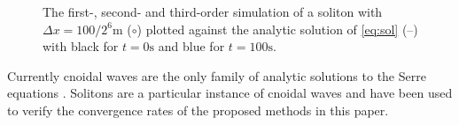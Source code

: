 \documentclass[SingleSpace,12pt]{Serre_ASCE}
\begin{document}
\begin{figure}[htb]
\centering
{}
\caption{The first-, second- and third-order simulation of a soliton with $\Delta x = 100 /2^{6}\text{m}$ ($\circ$) plotted against the analytic solution of \eqref{eq:sol} (\---) with black for $t =0\text{s}$ and blue for $t=100\text{s}$.}
\label{fig:solitone}
\end{figure}
Currently cnoidal waves are the only family of analytic solutions to the Serre equations \cite{Carter-Cienfuegos-2010-259}. Solitons are a particular instance of cnoidal waves and have been used to verify the convergence rates of the proposed methods in this paper. 
\end{document}
